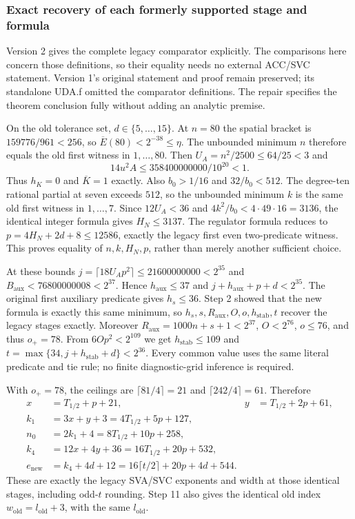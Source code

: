 \subsubsection{Exact recovery of each formerly supported stage and formula}
Version 2 gives the complete legacy comparator explicitly. The comparisons
here concern those definitions, so their equality needs no external ACC/SVC
statement. Version 1's original statement and proof remain preserved; its
standalone UDA.f omitted the comparator definitions. The repair specifies
the theorem conclusion fully without adding an analytic premise.

On the old tolerance set, $d\in\{5,\ldots,15\}$. At $n=80$ the spatial
bracket is $159776/961<256$, so
$\overline E(80)<2^{-38}\le\eta$. The unbounded minimum $n$ therefore
equals the old first witness in $1,\ldots,80$.
Then $U_A=n^2/2500\le64/25<3$ and
\[
 14u^2A\le358400000000/10^{20}<1.
\]
Thus $h_K=0$ and $\overline K=1$ exactly. Also $b_0>1/16$ and
$32/b_0<512$. The degree-ten rational partial at seven exceeds $512$,
so the unbounded minimum $k$ is the same old first witness in $1,\ldots,7$.
Since $12U_A<36$ and $4k^2/b_0<4\cdot49\cdot16=3136$, the identical
integer formula gives $H_N\le3137$. The regulator formula reduces to
$p=4H_N+2d+8\le12586$, exactly the legacy first even two-predicate
witness. This proves equality of $n,k,H_N,p$, rather than merely another
sufficient choice.

At these bounds $j=\lceil18U_Ap^2\rceil\le21600000000<2^{35}$ and
$B_{\mathrm{aux}}<76800000008<2^{37}$.
Hence $h_{\mathrm{aux}}\le37$ and
$j+h_{\mathrm{aux}}+p+d<2^{35}$. The original first auxiliary predicate
gives $h_s\le36$. Step 2 showed that the new formula is exactly this same
minimum, so $h_s,s,R_{\mathrm{aux}},O,o,h_{\mathrm{stab}},t$ recover the
legacy stages exactly. Moreover
$R_{\mathrm{aux}}=1000n+s+1<2^{37}$, $O<2^{76}$, $o\le76$, and thus
$o_+=78$. From $6Op^2<2^{109}$ we get $h_{\mathrm{stab}}\le109$ and
$t=\max\{34,j+h_{\mathrm{stab}}+d\}<2^{36}$.
Every common value uses the same literal predicate and tie rule;
no finite diagnostic-grid inference is required.

With $o_+=78$, the ceilings are $\lceil81/4\rceil=21$ and
$\lceil242/4\rceil=61$. Therefore
\begin{align*}
 x&=T_{1/2}+p+21,&y&=T_{1/2}+2p+61,\\
 k_1&=3x+y+3=4T_{1/2}+5p+127,\\
 n_0&=2k_1+4=8T_{1/2}+10p+258,\\
 k_4&=12x+4y+36=16T_{1/2}+20p+532,\\
 e_{\mathrm{new}}&=k_4+4d+12=16\lceil t/2\rceil+20p+4d+544.
\end{align*}
These are exactly the legacy SVA/SVC exponents and width at those identical
stages, including odd-$t$ rounding. Step 11 also gives the identical old
index $w_{\mathrm{old}}=l_{\mathrm{old}}+3$, with the same $l_{\mathrm{old}}$.

